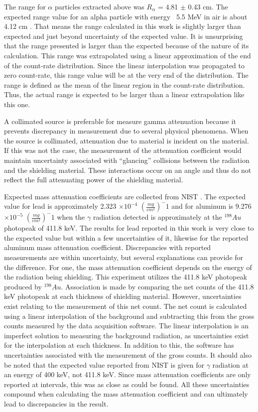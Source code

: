 The range for $\alpha$ particles extracted above was $R_{\alpha}$ = 4.81 $\pm$ 0.43 cm. The expected range value for an alpha particle with energy ~5.5 MeV in air is about 4.12 cm \cite{nistrange}. That means the range calculated in this work is slightly larger than expected and just beyond uncertainty of the expected value. It is unsurprising that the range presented is larger than the expected because of the nature of its calculation. This range was extrapolated using a linear approximation of the end of the count-rate distribution. Since the linear interpolation was propagated to zero count-rate, this range value will be at the very end of the distribution. The range is defined as the mean of the linear region in the count-rate distribution. Thus, the actual range is expected to be larger than a linear extrapolation like this one.

A collimated source is preferable for measure gamma attenuation because it prevents discrepancy in measurement due to several physical phenomena. When the source is collimated, attenuation due to material is incident on the material. If this was not the case, the measurement of the attenuation coefficient would maintain uncertainty associated with “glancing” collisions between the radiation and the shielding material. These interactions occur on an angle and thus do not reflect the full attenuating power of the shielding material.

Expected mass attenuation coefficients are collected from NIST \cite{nist}. The expected value for lead is approximately 2.323 $\times 10^{-4}$ $(\frac{mg}{cm^2})^-1$ and for aluminum is 9.276 $\times 10^{-5}$ $(\frac{mg}{cm^2})^-1$ when the $\gamma$ radiation detected is approximately at the ${}^{198}Au$ photopeak of 411.8 keV. The results for lead reported in this work is very close to the expected value but within a few uncertainties of it, likewise for the reported aluminum mass attenuation coefficient. Discrepancies with reported measurements are within uncertainty, but several explanations can provide for the difference. For one, the mass attenuation coefficient depends on the energy of the radiation being shielding. This experiment utilizes the 411.8 keV photopeak produced by ${}^{198}Au$. Association is made by comparing the net counts of the 411.8 keV photopeak at each thickness of shielding material. However, uncertainties exist relating to the measurement of this net count. The net count is calculated using a linear interpolation of the background and subtracting this from the gross counts measured by the data acquisition software. The linear interpolation is an imperfect solution to measuring the background radiation, as uncertainties exist for the interpolation at each thickness. In addition to this, the software has uncertainties associated with the measurement of the gross counts. It should also be noted that the expected value reported from NIST is given for $\gamma$ radiation at an energy of 400 keV, not 411.8 keV. Since mass attenuation coefficients are only reported at intervals, this was as close as could be found. All these uncertainties compound when calculating the mass attenuation coefficient and can ultimately lead to discrepancies in the result.

